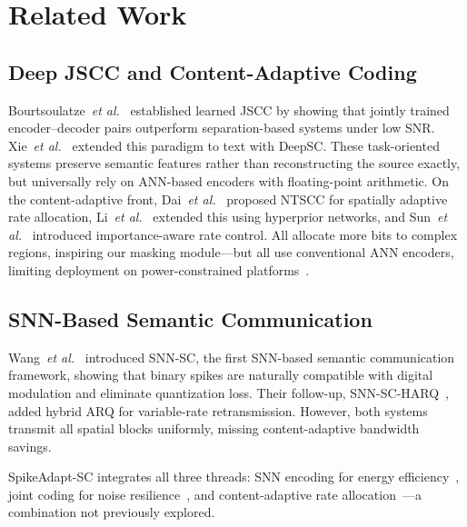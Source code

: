 \documentclass[conference]{IEEEtran}
\begin{document}
\section{Related Work}
\label{sec:related}

\subsection{Deep JSCC and Content-Adaptive Coding}
Bourtsoulatze~\emph{et al.}~\cite{bourtsoulatze2019deep} established learned JSCC by showing that jointly trained encoder--decoder pairs outperform separation-based systems under low SNR. Xie~\emph{et al.}~\cite{xie2021deep} extended this paradigm to text with DeepSC. These task-oriented systems preserve semantic features rather than reconstructing the source exactly, but universally rely on ANN-based encoders with floating-point arithmetic. On the content-adaptive front, Dai~\emph{et al.}~\cite{dai2022ntscc} proposed NTSCC for spatially adaptive rate allocation, Li~\emph{et al.}~\cite{li2024djscc} extended this using hyperprior networks, and Sun~\emph{et al.}~\cite{yang2023ircsc} introduced importance-aware rate control. All allocate more bits to complex regions, inspiring our masking module---but all use conventional ANN encoders, limiting deployment on power-constrained platforms~\cite{davies2018loihi, akopyan2015truenorth}.

\subsection{SNN-Based Semantic Communication}
Wang~\emph{et al.}~\cite{wang2024snnsc} introduced SNN-SC, the first SNN-based semantic communication framework, showing that binary spikes are naturally compatible with digital modulation and eliminate quantization loss. Their follow-up, SNN-SC-HARQ~\cite{wang2023snnsc_harq}, added hybrid ARQ for variable-rate retransmission. However, both systems transmit all spatial blocks uniformly, missing content-adaptive bandwidth savings.

SpikeAdapt-SC integrates all three threads: SNN encoding for energy efficiency~\cite{wang2024snnsc, wang2023snnsc_harq}, joint coding for noise resilience~\cite{bourtsoulatze2019deep, dai2022ntscc}, and content-adaptive rate allocation~\cite{li2024djscc, yang2023ircsc}---a combination not previously explored.
\end{document}
